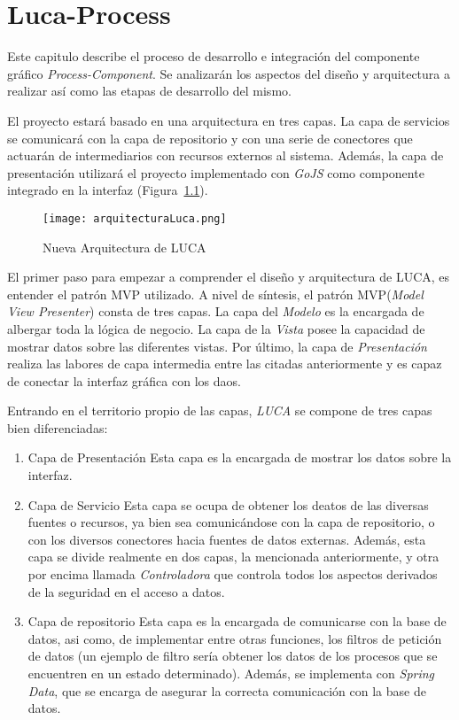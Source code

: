 \chapter{Luca-Process}
	
Este capitulo describe el proceso de desarrollo e integración del componente gráfico \emph{Process-Component}. Se analizarán los aspectos del diseño y arquitectura a realizar así como las etapas de desarrollo del mismo.
	

El proyecto estará basado en una arquitectura en tres capas. La capa de servicios se comunicará con la capa de repositorio y con una serie de conectores que actuarán de intermediarios con recursos externos al sistema. Además, la capa de presentación utilizará el proyecto implementado con \emph{GoJS} como componente integrado en la interfaz (Figura~\ref{fig:arquitecturaLuca}).

\begin{figure}[H]
	\centering
	\texttt{[image: arquitecturaLuca.png]}
	\caption{Nueva Arquitectura de LUCA}\label{fig:arquitecturaLuca}
\end{figure}


El primer paso para empezar a comprender el diseño y arquitectura de LUCA, es entender el patrón MVP\cite{mvp} utilizado.
A nivel de síntesis, el patrón MVP(\emph{Model View Presenter}) consta de tres capas. La capa del \emph{Modelo} es la encargada de albergar toda la lógica de negocio. La capa de la \emph{Vista} posee la capacidad de mostrar datos sobre las diferentes vistas. Por último, la capa de \emph{Presentación} realiza las labores de capa intermedia entre las citadas anteriormente y es capaz de conectar la interfaz gráfica con los daos.


Entrando en el territorio propio de las capas, \emph{LUCA} se compone de tres capas bien diferenciadas:

\begin{enumerate}
	\item Capa de Presentación \subitem Esta capa es la encargada de mostrar los datos sobre la interfaz.
	\item Capa de Servicio \subitem Esta capa se ocupa de obtener los deatos de las diversas fuentes o recursos, ya bien sea comunicándose con la capa de repositorio, o con los diversos conectores hacia fuentes de datos externas. Además, esta capa se divide realmente en dos capas, la mencionada anteriormente, y otra por encima llamada \emph{Controladora} que controla todos los aspectos derivados de la seguridad en el acceso a datos.
	\item Capa de repositorio \subitem Esta capa es la encargada de comunicarse con la base de datos, asi como, de implementar entre otras funciones, los filtros de petición de datos (un ejemplo de filtro sería obtener los datos de los procesos que se encuentren en un estado determinado). Además, se implementa con \emph{Spring Data}\cite{jpa}, que se encarga de asegurar la correcta comunicación con la base de datos.
\end{enumerate}


